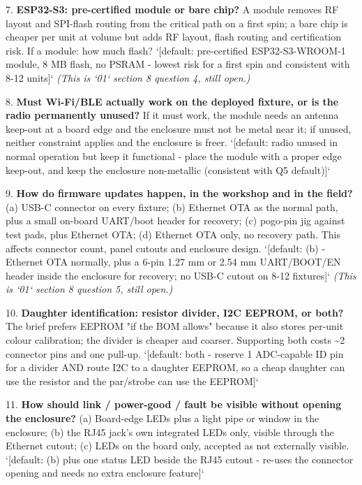 \documentclass[11pt,a4paper]{article}
\begin{document}
7. \textbf{ESP32-S3: pre-certified module or bare chip?} A module removes RF layout and SPI-flash routing from the critical path on a first spin; a bare chip is cheaper per unit at volume but adds RF layout, flash routing and certification risk. If a module: how much flash? `{[}default: pre-certified ESP32-S3-WROOM-1 module, 8 MB flash, no PSRAM - lowest risk for a first spin and consistent with 8-12 units{]}` \emph{(This is `01` section 8 question 4, still open.)}

8. \textbf{Must Wi-Fi/BLE actually work on the deployed fixture, or is the radio permanently unused?} If it must work, the module needs an antenna keep-out at a board edge and the enclosure must not be metal near it; if unused, neither constraint applies and the enclosure is freer. `{[}default: radio unused in normal operation but keep it functional - place the module with a proper edge keep-out, and keep the enclosure non-metallic (consistent with Q5 default){]}`

9. \textbf{How do firmware updates happen, in the workshop and in the field?} (a) USB-C connector on every fixture; (b) Ethernet OTA as the normal path, plus a small on-board UART/boot header for recovery; (c) pogo-pin jig against test pads, plus Ethernet OTA; (d) Ethernet OTA only, no recovery path. This affects connector count, panel cutouts and enclosure design. `{[}default: (b) - Ethernet OTA normally, plus a 6-pin 1.27 mm or 2.54 mm UART/BOOT/EN header inside the enclosure for recovery; no USB-C cutout on 8-12 fixtures{]}` \emph{(This is `01` section 8 question 5, still open.)}

10. \textbf{Daughter identification: resistor divider, I2C EEPROM, or both?} The brief prefers EEPROM "if the BOM allows" because it also stores per-unit colour calibration; the divider is cheaper and coarser. Supporting both costs \textasciitilde{}2 connector pins and one pull-up. `{[}default: both - reserve 1 ADC-capable ID pin for a divider AND route I2C to a daughter EEPROM, so a cheap daughter can use the resistor and the par/strobe can use the EEPROM{]}`

11. \textbf{How should link / power-good / fault be visible without opening the enclosure?} (a) Board-edge LEDs plus a light pipe or window in the enclosure; (b) the RJ45 jack's own integrated LEDs only, visible through the Ethernet cutout; (c) LEDs on the board only, accepted as not externally visible. `{[}default: (b) plus one status LED beside the RJ45 cutout - re-uses the connector opening and needs no extra enclosure feature{]}`
\end{document}
